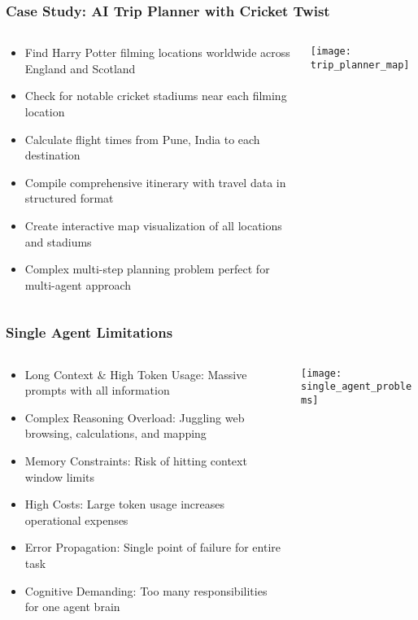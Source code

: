 \begin{frame}[fragile]\frametitle{Case Study: AI Trip Planner with Cricket Twist}
\begin{columns}
    \begin{column}[T]{0.6\linewidth}
      \begin{itemize}
		\item Find Harry Potter filming locations worldwide across England and Scotland
		\item Check for notable cricket stadiums near each filming location
		\item Calculate flight times from Pune, India to each destination
		\item Compile comprehensive itinerary with travel data in structured format
		\item Create interactive map visualization of all locations and stadiums
		\item Complex multi-step planning problem perfect for multi-agent approach
	  \end{itemize}
    \end{column}
    \begin{column}[T]{0.4\linewidth}
		\begin{center}
		\texttt{[image: trip\_planner\_map]}
		\end{center}	
    \end{column}
  \end{columns}
\end{frame}

\begin{frame}[fragile]\frametitle{Single Agent Limitations}
\begin{columns}
    \begin{column}[T]{0.6\linewidth}
      \begin{itemize}
		\item Long Context \& High Token Usage: Massive prompts with all information
		\item Complex Reasoning Overload: Juggling web browsing, calculations, and mapping
		\item Memory Constraints: Risk of hitting context window limits
		\item High Costs: Large token usage increases operational expenses
		\item Error Propagation: Single point of failure for entire task
		\item Cognitive Demanding: Too many responsibilities for one agent brain
	  \end{itemize}
    \end{column}
    \begin{column}[T]{0.4\linewidth}
		\begin{center}
		\texttt{[image: single\_agent\_problems]}
		\end{center}	
    \end{column}
  \end{columns}
\end{frame}

